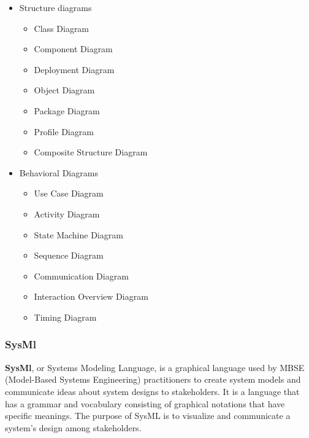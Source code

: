 \begin{itemize}
\item Structure diagrams 
\begin{itemize}
\item Class Diagram
\item Component Diagram
\item Deployment Diagram
\item Object Diagram
\item Package Diagram
\item Profile Diagram
\item Composite Structure Diagram
\end{itemize}
\item Behavioral Diagrams
\begin{itemize}
\item Use Case Diagram
\item Activity Diagram
\item State Machine Diagram
\item Sequence Diagram
\item Communication Diagram
\item Interaction Overview Diagram
\item Timing Diagram
\end{itemize}
\end{itemize}

\subsubsection{SysMl}
\textbf{SysMl},  or Systems Modeling Language, is a graphical language used by MBSE (Model-Based Systems Engineering) practitioners to create system models and communicate ideas about system designs to stakeholders. It is a language that has a grammar and vocabulary consisting of graphical notations that have specific meanings. The purpose of SysML is to visualize and communicate a system's design among stakeholders.\cite{LD13}

